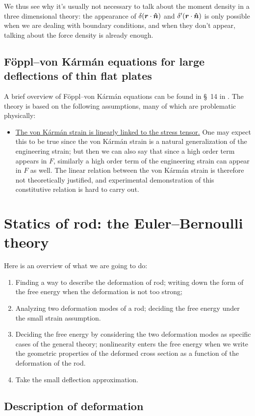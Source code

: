 \documentclass[hyperref, a4paper]{article}
\newcommand*{\citesec}[1]{\S~{#1}}
\begin{document}
We thus see why it's usually not necessary to talk about the moment density 
in a three dimensional theory:
the appearance of $\delta(\vb*{r} \cdot \vu*{n})$ and $\delta'(\vb*{r} \cdot \vu*{n})$
is only possible when we are dealing with boundary conditions,
and when they don't appear, 
talking about the force density is already enough.

\subsection{Föppl–von Kármán equations for  large deflections of thin flat plates}

A brief overview of Föppl–von Kármán equations can be found 
in \citesec{14} in \cite{landau1986theory}.
The theory is based on the following assumptions,
many of which are problematic physically:
\begin{itemize}
    \item \ul{The von Kármán strain is linearly linked to the stress tensor.}
    One may expect this to be true since 
    the von Kármán strain is a natural generalization 
    of the engineering strain;
    but then we can also say that 
    since a high order term appears in $F$,
    similarly a high order term of the engineering strain can appear in $F$ as well.
    The linear relation between the von Kármán strain 
    is therefore not theoretically justified,
    and experimental demonstration of this constitutive relation 
    is hard to carry out.
\end{itemize}

\section{Statics of rod: the Euler–Bernoulli theory}

Here is an overview of what we are going to do:
\begin{enumerate}
    \item Finding a way to describe the deformation of rod; 
        writing down the form of the free energy 
        when the deformation is not too strong; 
    \item Analyzing two deformation modes of a rod; 
        deciding the free energy 
        under the small strain assumption.
    \item Deciding the free energy
        by considering the two deformation modes 
        as specific cases of the general theory; 
        nonlinearity enters the free energy 
        when we write the geometric properties of the deformed cross section 
        as a function of the deformation of the rod.
    \item Take the small deflection approximation.
\end{enumerate}

\subsection{Description of deformation}



\printbibliography
\end{document}
